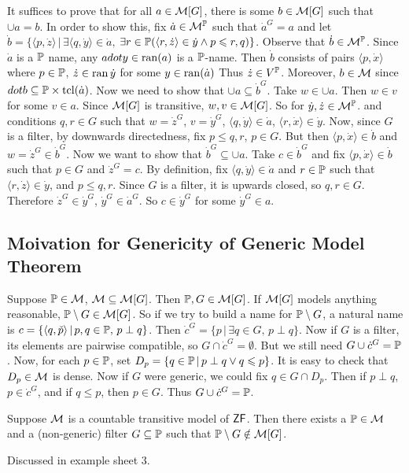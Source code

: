 \documentclass{article}
\begin{document}
\proof It suffices to prove that for all $a \in \mathcal{M}[G]$, there is some $b \in \mathcal{M}[G]$ such that $\cup a = b$. In order to show this, fix $\dot{a} \in \mathcal{M}^{\mathbb{P}}$ such that $\dot{a}^{G} = a$ and let $\dot{b} = \{ \langle p, \dot{z} \rangle \, | \, \exists \langle q, \dot{y} \rangle \in \dot{a},$$\, \exists r \in \mathbb{P} (\langle r, \dot{z} \rangle \in \dot{y} \wedge p \leqslant r,q)\}$. \gap
    Observe that $\dot{b} \in \mathcal{M}^{\mathbb{P}}$. Since $\dot{a}$ is a $\mathbb{P}$ name, any $adot{y} \in \operatorname{ran}(a)$ is a $\mathbb{P}$-name. Then $\dot{b}$ consists of pairs $\langle p, \dot{x}\rangle$ where $p \in \mathbb{P}$, $\dot{z} \in \operatorname{ran}{\dot{y}}$ for some $y \in \operatorname{ran}(\dot{a})$ Thus $\dot{z} \in V^{\mathbb{P}}$. Moreover, $b \in \mathcal{M}$ since $dot{b} \subseteq \mathbb{P} \times \operatorname{tcl}(\dot{a})$.\gap
    Now we need to show that $\cup a \subseteq \dot{b}^{G}$. Take $w \in \cup a$. Then $w \in v$ for some $v \in a$. Since $\mathcal{M}[G]$ is transitive, $w,v \in \mathcal{M}[G]$. So for $\dot{y}, \dot{z} \in \mathcal{M}^{\mathbb{P}}$. and conditions $q,r \in G$ such that $w= \dot{z}^{G}$, $v = \dot{y}^{G}$, $\langle q, \dot{y} \rangle \in \dot{a}$, $\langle r, \dot{x} \rangle \in \dot{y}$. \gap
    Now, since $G$ is a filter, by downwards directedness, fix $ p \leq q,r$, $p \in G$. But then $\langle p, \dot{x} \rangle \in \dot{b}$ and $w = \dot{z}^{G} \in \dot{b}^{G}$. \gap
    Now we want to show that $\dot{b}^{G} \subseteq \cup a$. Take $c \in \dot{b}^{G}$ and fix $\langle p, \dot{x} \rangle \in \dot{b}$ such that $p \in G$ and $\dot{z}^{G} = c$. \gap
    By definition, fix $\langle q, \dot{y} \rangle \in \dot{a}$ and $r \in \mathbb{P}$ such that $\langle r, \dot{z} \rangle \in \dot{y}$, and $p \leq q,r$. Since $G$ is a filter, it is upwards closed, so $q,r \in G$. Therefore $\dot{z}^{G} \in \dot{y}^{G}$, $\dot{y}^{G} \in \dot{a}^{G}$. So $c \in \dot{y}^{G}$ for some $\dot{y}^{G} \in a$.
    \endproof
    \subsection{Moivation for Genericity of Generic Model Theorem}
    Suppose $\mathbb{P} \in \mathcal{M}$, $\mathcal{M} \subseteq \mathcal{M}[G]$. Then $\mathbb{P}, G \in \mathcal{M}[G]$. If $\mathcal{M}[G]$ models anything reasonable, $\mathbb{P} \setminus G \in \mathcal{M}[G]$. So if we try to build a name for $\mathbb{P} \setminus G$, a natural name is $c = \{ \langle q, \check{p} \rangle  \, | \, p,q \in \mathbb{P}, \, p \perp q\}$. Then $\dot{c}^{G} = \{ p \, | \, \exists q \in G, \, p \perp q\}$. Now if $G$ is a filter, its elements are pairwise compatible, so $G \cap \dot{c}^{G} = \emptyset$. But we still need $G \cup \dot{c}^{G} = \mathbb{P}$.\gap
    Now, for each $p \in \mathbb{P}$, set $D_{p} = \{ q \in \mathbb{P} \, | \, p \perp q \vee q \leqslant p\}$. It is easy to check that $D_{p} \in \mathcal{M}$ is dense. Now if $G$ were generic, we could fix $q \in G \cap D_{p}$. Then if $p \perp q$, $p \in \dot{c}^{G}$, and if $q \leq p$, then $p \in G$. Thus $G \cup \dot{c}^{G}=\mathbb{P}$.
    \begin{fancyprop}{}
        Suppose $\mathcal{M}$ is a countable transitive model of $\mathsf{ZF}$. Then there exists a $\mathbb{P} \in \mathcal{M}$ and a (non-generic) filter $G \subseteq \mathbb{P}$ such that $\mathbb{P} \setminus G \notin \mathcal{M}[G]$.
    \end{fancyprop}
    \proof Discussed in example sheet 3. \endproof
\end{document}
